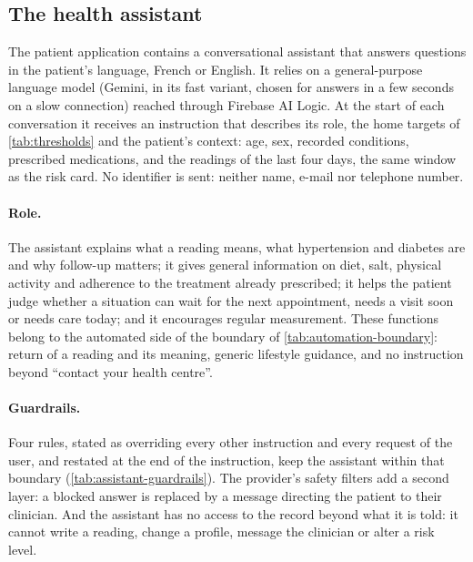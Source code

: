 \subsection{The health assistant}\label{sec:assistant}

The patient application contains a conversational assistant that answers questions in the patient's language, French or English. It relies on a general-purpose language model (Gemini, in its fast variant, chosen for answers in a few seconds on a slow connection) reached through Firebase AI Logic. At the start of each conversation it receives an instruction that describes its role, the home targets of \cref{tab:thresholds} and the patient's context: age, sex, recorded conditions, prescribed medications, and the readings of the last four days, the same window as the risk card. No identifier is sent: neither name, e-mail nor telephone number.

\paragraph{Role.} The assistant explains what a reading means, what hypertension and diabetes are and why follow-up matters; it gives general information on diet, salt, physical activity and adherence to the treatment already prescribed; it helps the patient judge whether a situation can wait for the next appointment, needs a visit soon or needs care today; and it encourages regular measurement. These functions belong to the automated side of the boundary of \cref{tab:automation-boundary}: return of a reading and its meaning, generic lifestyle guidance, and no instruction beyond ``contact your health centre''.

\paragraph{Guardrails.} Four rules, stated as overriding every other instruction and every request of the user, and restated at the end of the instruction, keep the assistant within that boundary (\cref{tab:assistant-guardrails}). The provider's safety filters add a second layer: a blocked answer is replaced by a message directing the patient to their clinician. And the assistant has no access to the record beyond what it is told: it cannot write a reading, change a profile, message the clinician or alter a risk level.

